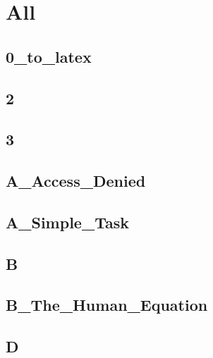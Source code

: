 \section{All}
\subsection{0\_to\_latex}
\raggedbottom
\hrulefill

\subsection{2}
\raggedbottom
\hrulefill

\subsection{3}
\raggedbottom
\hrulefill

\subsection{A\_Access\_Denied}
\raggedbottom
\hrulefill

\subsection{A\_Simple\_Task}
\raggedbottom
\hrulefill

\subsection{B}
\raggedbottom
\hrulefill

\subsection{B\_The\_Human\_Equation}
\raggedbottom
\hrulefill

\subsection{D}
\raggedbottom
\hrulefill

